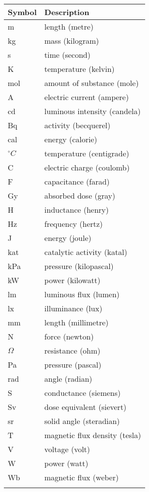 \documentclass[12pt]{article}
\begin{document}
\begin{longtable*}{l l}
\toprule
Symbol & Description
\\
\midrule
m & length (metre)
\\
kg & mass (kilogram)
\\
s & time (second)
\\
K & temperature (kelvin)
\\
mol & amount of substance (mole)
\\
A & electric current (ampere)
\\
cd & luminous intensity (candela)
\\
Bq & activity (becquerel)
\\
cal & energy (calorie)
\\
${}^{\circ}C$ & temperature (centigrade)
\\
C & electric charge (coulomb)
\\
F & capacitance (farad)
\\
Gy & absorbed dose (gray)
\\
H & inductance (henry)
\\
Hz & frequency (hertz)
\\
J & energy (joule)
\\
kat & catalytic activity (katal)
\\
kPa & pressure (kilopascal)
\\
kW & power (kilowatt)
\\
lm & luminous flux (lumen)
\\
lx & illuminance (lux)
\\
mm & length (millimetre)
\\
N & force (newton)
\\
$\Omega{}$ & resistance (ohm)
\\
Pa & pressure (pascal)
\\
rad & angle (radian)
\\
S & conductance (siemens)
\\
Sv & dose equivalent (sievert)
\\
sr & solid angle (steradian)
\\
T & magnetic flux density (tesla)
\\
V & voltage (volt)
\\
W & power (watt)
\\
Wb & magnetic flux (weber)
\\
\bottomrule
\label{Table:TablofUnit}
\end{longtable*}
\end{document}
